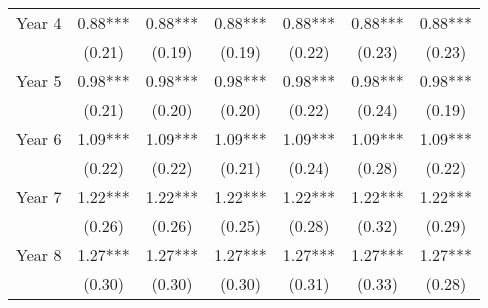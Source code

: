 \begin{table}[H]
\begin{tabular}[t]{lcccccc}
Year 4 & 0.88*** & 0.88*** & 0.88*** & 0.88*** & 0.88*** & 0.88***\\
 & (0.21) & (0.19) & (0.19) & (0.22) & (0.23) & (0.23)\\
Year 5 & 0.98*** & 0.98*** & 0.98*** & 0.98*** & 0.98*** & 0.98***\\
 & (0.21) & (0.20) & (0.20) & (0.22) & (0.24) & (0.19)\\
Year 6 & 1.09*** & 1.09*** & 1.09*** & 1.09*** & 1.09*** & 1.09***\\
 & (0.22) & (0.22) & (0.21) & (0.24) & (0.28) & (0.22)\\
Year 7 & 1.22*** & 1.22*** & 1.22*** & 1.22*** & 1.22*** & 1.22***\\
 & (0.26) & (0.26) & (0.25) & (0.28) & (0.32) & (0.29)\\
Year 8 & 1.27*** & 1.27*** & 1.27*** & 1.27*** & 1.27*** & 1.27***\\
 & (0.30) & (0.30) & (0.30) & (0.31) & (0.33) & (0.28)\\
\bottomrule
\end{tabular}
\end{table}
